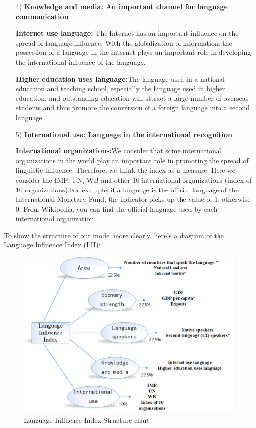 \begin{enumerate}
	\item[4)] \textbf{Knowledge and media: An important channel for language communication}
	\par\textbf{Internet use language: } The Internet has an important influence on the spread of language influence. With the globalization of information, the possession of a language in the Internet plays an important role in developing the international influence of the language.
	\par \textbf{Higher education uses language:}The language used in a national education and teaching school, especially the language used in higher education, and outstanding education will attract a large number of overseas students and thus promote the conversion of a foreign language into a second language.
	
	\item[5)] \textbf{International use: Language in the international recognition}
	\par \textbf{International organizations:}We consider that some international organizations in the world play an important role in promoting the spread of linguistic influence. Therefore, we think the index as a measure. Here we consider the IMF, UN, WB and other 10 international organizations (index of 10 organizations).For example, if a language is the official language of the International Monetary Fund, the indicator picks up the value of 1, otherwise 0. From Wikipedia, you can find the official language used by each international organization.
	
\end{enumerate}

\par To show the structure of our model more clearly, here's a diagram of the Language Influence Index (LII):

\begin{figure}[H]
	\centering
	\includegraphics[width=0.7\linewidth]{figures/chart}
	\caption{Language Influence Index Structure chart}
	\label{fig:chart}
\end{figure}

